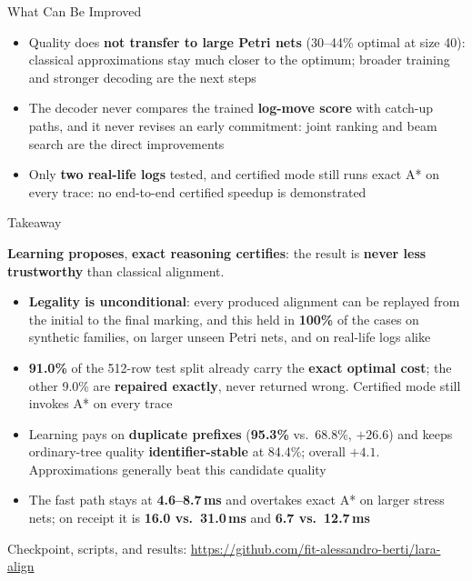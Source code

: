 \documentclass[aspectratio=169]{beamer}
\newcommand{\keyc}[1]{\textbf{\textcolor{larablue}{#1}}}
\newcommand{\keyg}[1]{\textbf{\textcolor{laraaqua!70!black}{#1}}}
\newcommand{\keya}[1]{\textbf{\textcolor{laraamber!85!black}{#1}}}
\begin{document}
\begin{frame}{What Can Be Improved}
  \begin{itemize}\setlength{\itemsep}{8pt}
    \item Quality does \keya{not transfer to large Petri nets}
      (30--44\% optimal at size 40): classical approximations stay
      much closer to the optimum; broader training and stronger
      decoding are the next steps
    \item The decoder never compares the trained \keya{log-move score}
      with catch-up paths, and it never revises an early commitment:
      joint ranking and beam search are the direct improvements
    \item Only \keya{two real-life logs} tested, and certified mode
      still runs exact A* on every trace: no end-to-end certified speedup
      is demonstrated
  \end{itemize}
\end{frame}

\begin{frame}{Takeaway}
  \begin{block}{}
    \centering \keyc{Learning proposes}, \keyg{exact reasoning certifies}:
    the result is \keyg{never less trustworthy} than classical alignment.
  \end{block}
  \vspace{2mm}
  \small
  \begin{itemize}\setlength{\itemsep}{6pt}
    \item \keyg{Legality is unconditional}: every produced alignment can be
      replayed from the initial to the final marking, and this held in
      \keyg{100\%} of the cases on synthetic families, on larger unseen
      Petri nets, and on real-life logs alike
    \item \keyc{91.0\%} of the 512-row test split already carry the
      \keyc{exact optimal cost}; the other 9.0\% are \keyg{repaired exactly},
      never returned wrong. Certified mode still invokes A* on every trace
    \item Learning pays on \keya{duplicate prefixes}
      (\keyc{95.3\%} vs.\ 68.8\%, $+26.6$) and keeps ordinary-tree quality
      \keyc{identifier-stable} at 84.4\%; overall $+4.1$.
      Approximations generally beat this candidate quality
    \item The fast path stays at \keyc{4.6--8.7\,ms} and overtakes exact A*
      on larger stress nets; on receipt it is
      \keyc{16.0 vs.\ 31.0\,ms} and \keyc{6.7 vs.\ 12.7\,ms}
  \end{itemize}
  \vspace{1mm}
  \centering\small Checkpoint, scripts, and results:
  \url{https://github.com/fit-alessandro-berti/lara-align}
\end{frame}
\end{document}
